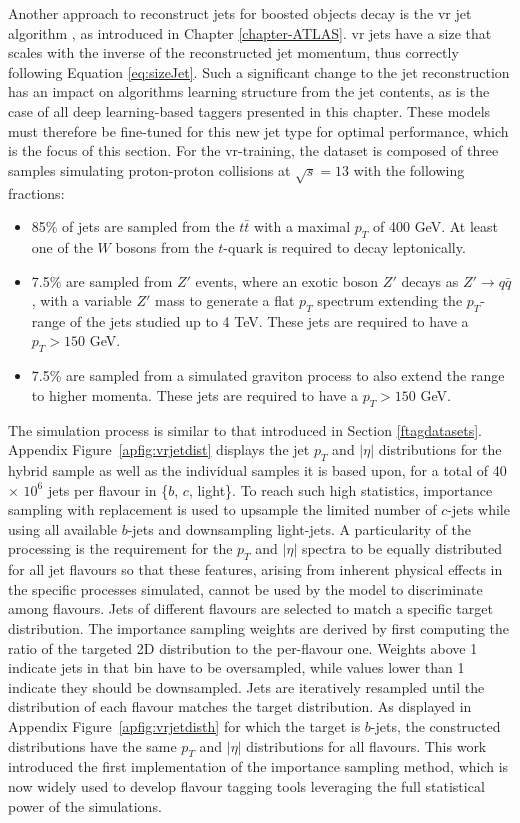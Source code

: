 Another approach to reconstruct jets for boosted objects decay is the \gls{vr} jet algorithm \cite{vrJetPaper}, as introduced in Chapter \ref{chapter-ATLAS}. \gls{vr} jets have a size that scales with the inverse of the reconstructed jet momentum, thus correctly following Equation \ref{eq:sizeJet}. Such a significant change to the jet reconstruction has an impact on algorithms learning structure from the jet contents, as is the case of all deep learning-based taggers presented in this chapter. These models must therefore be fine-tuned for this new jet type for optimal performance, which is the focus of this section. For the \gls{vr}-training, the dataset is composed of three samples simulating proton-proton collisions at $\sqrt{s} = 13$ with the following fractions:
\begin{itemize}
  \item 85\% of jets are sampled from the $t\bar{t}$ with a maximal $p_T$ of 400 GeV. At least one of the $W$ bosons from the $t$-quark is required to decay leptonically.
  \item 7.5\% are sampled from $Z'$ events, where an exotic boson $Z'$ decays as $Z' \rightarrow q\bar{q}$, with a variable $Z'$ mass to generate a flat $p_T$ spectrum extending the $p_T$-range of the jets studied up to 4 TeV. These jets are required to have a $p_T > 150$ GeV.
  \item 7.5\% are sampled from a simulated graviton process to also extend the range to higher momenta. These jets are required to have a $p_T > 150$ GeV.
\end{itemize}

The simulation process is similar to that introduced in Section \ref{ftagdatasets}. Appendix Figure~\ref{apfig:vrjetdist} displays the jet $p_T$ and $|\eta|$ distributions for the hybrid sample as well as the individual samples it is based upon, for a total of 40 $\times$ $10^6$ jets per flavour in \{$b$, $c$, light\}. To reach such high statistics, importance sampling with replacement is used to upsample the limited number of $c$-jets while using all available $b$-jets and downsampling light-jets. A particularity of the processing is the requirement for the $p_T$ and $|\eta|$ spectra to be equally distributed for all jet flavours so that these features, arising from inherent physical effects in the specific processes simulated, cannot be used by the model to discriminate among flavours. Jets of different flavours are selected to match a specific target distribution. The importance sampling weights are derived by first computing the ratio of the targeted 2D distribution to the per-flavour one. Weights above 1 indicate jets in that bin have to be oversampled, while values lower than 1 indicate they should be downsampled. Jets are iteratively resampled until the distribution of each flavour matches the target distribution. As displayed in Appendix Figure~\ref{apfig:vrjetdisth} for which the target is $b$-jets, the constructed distributions have the same $p_T$ and $|\eta|$ distributions for all flavours. This work introduced the first implementation of the importance sampling method, which is now widely used to develop flavour tagging tools leveraging the full statistical power of the simulations. \\ 
 
